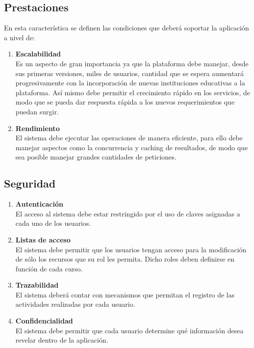 \subsection{Prestaciones}
En esta característica se definen las condiciones que deberá soportar la aplicación a nivel de:
\begin{enumerate}
	\item \textbf{Escalabilidad} \\
	Es un aspecto de gran importancia ya que la plataforma debe manejar, desde sus primeras versiones, miles de usuarios, cantidad que se espera aumentará progresivamente con la incorporación de nuevas instituciones educativas a la plataforma. Así mismo debe permitir el crecimiento rápido en los servicios, de modo que se pueda dar respuesta rápida a los nuevos requerimientos que puedan surgir.
	\item \textbf{Rendimiento} \\
	El sistema debe ejecutar las operaciones de manera eficiente, para ello debe manejar aspectos como la concurrencia y caching de resultados, de modo que sea posible manejar grandes cantidades de peticiones.
\end{enumerate}

\subsection{Seguridad}
\begin{enumerate}
	\item \textbf{Autenticación} \\
	El acceso al sistema debe estar restringido por el uso de claves asignadas a cada uno de los usuarios.
	\item \textbf{Listas de acceso} \\
	El sistema debe permitir que los usuarios tengan acceso para la modificación de sólo los recursos que su rol les permita. Dicho roles deben definirse en función de cada curso.
	\item \textbf{Trazabilidad} \\
	El sistema deberá contar con mecanismos que permitan el registro de las actividades realizadas por cada usuario.
	\item \textbf{Confidencialidad} \\
	El sistema debe permitir que cada usuario determine qué información desea revelar dentro de la aplicación.
\end{enumerate}